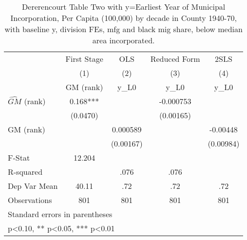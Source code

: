 \begin{table}[htbp]\centering
\def\sym#1{\ifmmode^{#1}\else\(^{#1}\)\fi}
\caption{Dererencourt Table Two with y=Earliest Year of Municipal Incorporation, Per Capita (100,000) by decade in County 1940-70, with baseline y, division FEs, mfg and black mig share, below median area incorporated.}
\begin{tabular}{l*{4}{c}}
\toprule
                    & First Stage   &         OLS   &Reduced Form   &        2SLS   \\
                    &\multicolumn{1}{c}{(1)}&\multicolumn{1}{c}{(2)}&\multicolumn{1}{c}{(3)}&\multicolumn{1}{c}{(4)}\\
                    &\multicolumn{1}{c}{GM  (rank)}&\multicolumn{1}{c}{y\_L0}&\multicolumn{1}{c}{y\_L0}&\multicolumn{1}{c}{y\_L0}\\
\midrule
$\hat{GM}$ (rank)   &       0.168***&               &   -0.000753   &               \\
                    &    (0.0470)   &               &   (0.00165)   &               \\
\addlinespace
GM  (rank)          &               &    0.000589   &               &    -0.00448   \\
                    &               &   (0.00167)   &               &   (0.00984)   \\
\midrule
F-Stat              &      12.204   &               &               &               \\
R-squared           &               &        .076   &        .076   &               \\
Dep Var Mean        &       40.11   &         .72   &         .72   &         .72   \\
Observations        &         801   &         801   &         801   &         801   \\
\bottomrule
\multicolumn{5}{l}{\footnotesize Standard errors in parentheses}\\
\multicolumn{5}{l}{\footnotesize * p<0.10, ** p<0.05, *** p<0.01}\\
\end{tabular}
\end{table}
